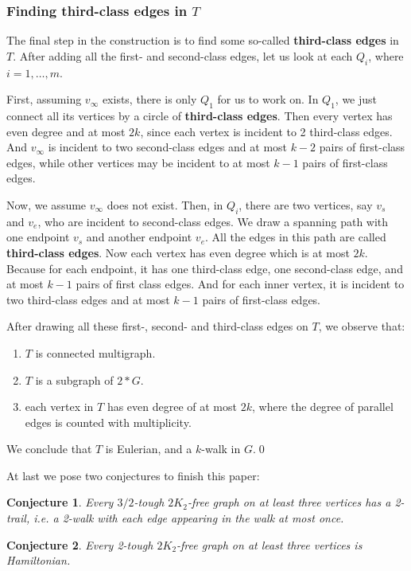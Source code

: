 \documentclass[12pt]{article}
\newtheorem{conjecture}{Conjecture}
\begin{document}
\subsubsection{
Finding third-class edges in $T$}

The final step in the construction is to find some so-called {\bf third-class edges} in $T$. After adding all the first- and second-class edges, let us look at each $Q_i$, where $i=1,\ldots,m$.

First, assuming $v_{\infty}$ exists, there is only $Q_1$ for us to work on. In $Q_1$, we just connect all its vertices by a circle of {\bf third-class edges}. Then every vertex has even degree and at most $2k$, since each vertex is incident to 2 third-class edges. And $v_{\infty}$ is incident to two second-class edges and at most $k-2$ pairs of first-class edges, while other vertices may be incident to at most $k-1$ pairs of first-class edges.

Now, we assume $v_{\infty}$ does not exist. Then, in $Q_i$, there are two vertices, say $v_s$ and $v_e$, who are incident to second-class edges. We draw a spanning path with one endpoint $v_s$ and another endpoint $v_e$. All the edges in this path are called {\bf third-class edges}.
Now each vertex has even degree which is at most $2k$. Because for each endpoint, it has one third-class edge, one second-class edge, and at most $k-1$ pairs of first class edges. And for each inner vertex, it is incident to two third-class edges and at most $k-1$ pairs of first-class edges.



After drawing all these first-, second- and third-class edges on $T$, we observe that:
\begin{enumerate}
\item $T$ is connected multigraph.
\item $T$ is a subgraph of $2*G$.
\item each vertex in $T$ has even degree of at most $2k$, where the degree of parallel edges is counted with multiplicity.
\end{enumerate}
We conclude that $T$ is Eulerian, and a $k$-walk in $G$.\qed



At last we pose two conjectures to finish this paper:


\begin{conjecture}
Every $3/2$-tough $2K_2$-free graph on at least three vertices has a 2-trail, i.e. a 2-walk with each edge appearing in the walk at most once.
\end{conjecture}


\begin{conjecture}
Every 2-tough $2K_2$-free graph on at least three vertices is Hamiltonian.
\end{conjecture}



























\end{document}
